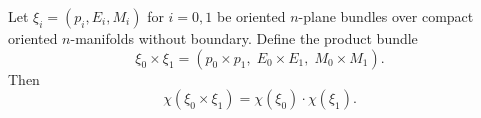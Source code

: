 Let $\xi_{i} = (p_{i}, E_{i}, M_{i})$ for $i = 0, 1$ be oriented $n$-plane bundles over compact oriented $n$-manifolds without boundary. Define the product bundle
$$
\xi_{0} \times \xi_{1} = (p_{0} \times p_{1},\; E_{0} \times E_{1},\; M_{0} \times M_{1}).
$$
Then
$$
\chi(\xi_{0} \times \xi_{1}) = \chi(\xi_{0}) \cdot \chi(\xi_{1}).
$$
